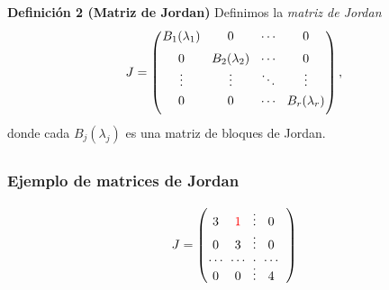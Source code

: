
\subsection{}

\begin{frame}%
	
	\begin{block}{\textbf{Definición 2 (Matriz de Jordan)}}
		\justifying	
		Definimos la \textit{matriz de Jordan}
		\[
		J = 
		\left(
		\begin{array}{@{\hspace{0.1\tabcolsep}}c@{\hspace{1.5\tabcolsep}}c@{\hspace{1.5\tabcolsep}}c@{\hspace{1.5\tabcolsep}}c@{\hspace{0.1\tabcolsep}}}
		B_1(\lambda_1) & 0  & \cdots  & 0 \\[2mm]
		           0 & B_2(\lambda_2) & \cdots & 0 \\[0mm]
		      \vdots &     \vdots   & \ddots & \vdots \\[1mm]
		           0 &          0   & \cdots       & B_r(\lambda_r)  \\[2mm]
		\end{array}
		\right),
		\]
		donde cada $B_j(\lambda_j)$ es una matriz de bloques de Jordan.
	\end{block}
	
	
\end{frame}


\subsection{}

\begin{frame}\frametitle{Ejemplo de matrices de Jordan}
	
	\[
	J = 
	\left(
	\begin{array}{@{\hspace{0.1\tabcolsep}}c@{\hspace{\tabcolsep}}c@{\hspace{\tabcolsep}}c@{\hspace{\tabcolsep}}c@{\hspace{\tabcolsep}}c@{\hspace{0.1\tabcolsep}}}
	3 & {\color{red}1} & \vdots & 0 \\[0mm]
	0 & 3 & \vdots & 0 \\[-0mm]
	\cdots & \cdots  & \cdot & \cdots \\[-2mm]
	0 & 0 & \vdots & 4 \\
	\end{array}
	\right) 	
	\]
	
\end{frame}

